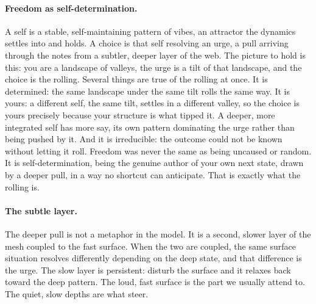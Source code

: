 \paragraph{Freedom as self-determination.}
A self is a stable, self-maintaining pattern of vibes, an attractor the dynamics settles into
and holds. A choice is that self resolving an urge, a pull arriving through the notes from a
subtler, deeper layer of the web. The picture to hold is this: you are a landscape of valleys,
the urge is a tilt of that landscape, and the choice is the rolling. Several things are true of
the rolling at once. It is determined: the same landscape under the same tilt rolls the same
way. It is yours: a different self, the same tilt, settles in a different valley, so the choice
is yours precisely because your structure is what tipped it. A deeper, more integrated self has
more say, its own pattern dominating the urge rather than being pushed by it. And it is
irreducible: the outcome could not be known without letting it roll. Freedom was never the same
as being uncaused or random. It is self-determination, being the genuine author of your own
next state, drawn by a deeper pull, in a way no shortcut can anticipate. That is exactly what
the rolling is.

\paragraph{The subtle layer.}
The deeper pull is not a metaphor in the model. It is a second, slower layer of the mesh
coupled to the fast surface. When the two are coupled, the same surface situation resolves
differently depending on the deep state, and that difference is the urge. The slow layer is
persistent: disturb the surface and it relaxes back toward the deep pattern. The loud, fast
surface is the part we usually attend to. The quiet, slow depths are what steer.
